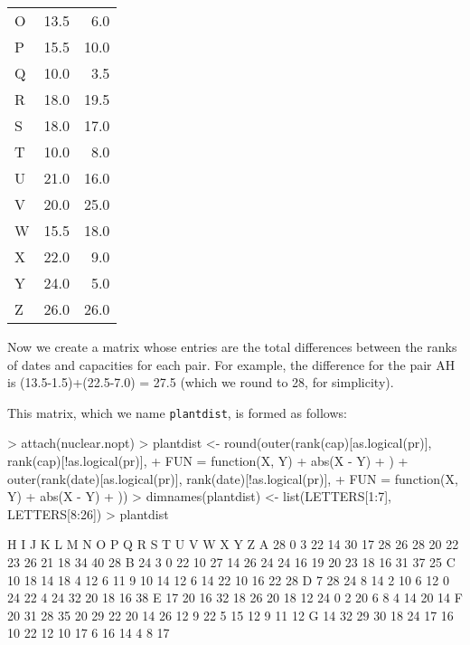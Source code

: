 \documentclass[12pt,twoside]{article}
\begin{document}
{{\begin{minipage}[t]{.4\textwidth}
\begin{center}
{\begin{tabular}{lrr}
 {O} & 13.5 & 6.0 \\
 {P} & 15.5 & 10.0 \\
 {Q} & 10.0 & 3.5 \\
 {R} & 18.0 & 19.5 \\
 {S} & 18.0 & 17.0 \\
 {T} & 10.0 & 8.0 \\
 {U} & 21.0 & 16.0 \\
 {V} & 20.0 & 25.0 \\
 {W} & 15.5 & 18.0 \\
 {X} & 22.0 & 9.0 \\
 {Y} & 24.0 & 5.0 \\
 {Z} & 26.0 & 26.0 \\
\hline
\end{tabular}}
\end{center}
\end{minipage}

\bigskip

{\ttfamily
\textrm{Now we create a matrix whose entries are the total differences
between the ranks of dates and capacities for each pair. For example,
the difference for the pair AH is (13.5{}-1.5)+(22.5{}-7.0) = 27.5
(which we round to 28, for simplicity)}.}


\bigskip

{\ttfamily
\textrm{This matrix, which we name }\texttt{plantdist}\textrm{, is formed as
follows:}}


\bigskip

\begin{Schunk}
\begin{Sinput}
> attach(nuclear.nopt)
> plantdist <- round(outer(rank(cap)[as.logical(pr)], rank(cap)[!as.logical(pr)], 
+     FUN = function(X, Y) {
+         abs(X - Y)
+     }) + outer(rank(date)[as.logical(pr)], rank(date)[!as.logical(pr)], 
+     FUN = function(X, Y) {
+         abs(X - Y)
+     }))
> dimnames(plantdist) <- list(LETTERS[1:7], LETTERS[8:26])
> plantdist
\end{Sinput}
\begin{Soutput}
   H  I  J  K  L  M  N  O  P  Q  R  S  T  U  V  W  X  Y  Z
A 28  0  3 22 14 30 17 28 26 28 20 22 23 26 21 18 34 40 28
B 24  3  0 22 10 27 14 26 24 24 16 19 20 23 18 16 31 37 25
C 10 18 14 18  4 12  6 11  9 10 14 12  6 14 22 10 16 22 28
D  7 28 24  8 14  2 10  6 12  0 24 22  4 24 32 20 18 16 38
E 17 20 16 32 18 26 20 18 12 24  0  2 20  6  8  4 14 20 14
F 20 31 28 35 20 29 22 20 14 26 12  9 22  5 15 12  9 11 12
G 14 32 29 30 18 24 17 16 10 22 12 10 17  6 16 14  4  8 17
\end{Soutput}
\end{Schunk}

}}
\end{document}
